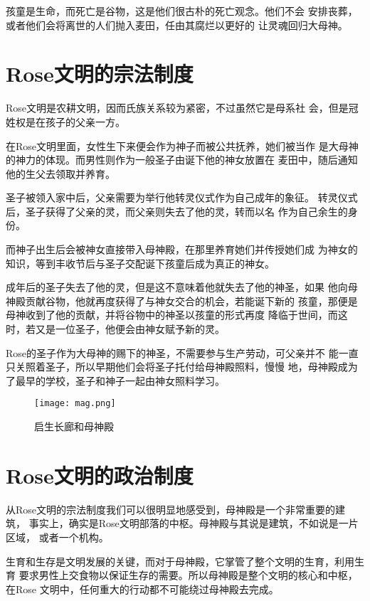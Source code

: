 \documentclass[UTF8,12pt]{ctexbook}
\begin{document}
            孩童是生命，而死亡是谷物，这是他们很古朴的死亡观念。他们不会
            安排丧葬，或者他们会将离世的人们抛入麦田，任由其腐烂以更好的
            让灵魂回归大母神。

        \section{Rose文明的宗法制度}
            Rose文明是农耕文明，因而氏族关系较为紧密，不过虽然它是母系社
            会，但是冠姓权是在孩子的父亲一方。

            在Rose文明里面，女性生下来便会作为神子而被公共抚养，她们被当作
            是大母神的神力的体现。而男性则作为一般圣子由诞下他的神女放置在
            麦田中，随后通知他的生父去领取并养育。

            圣子被领入家中后，父亲需要为举行他转灵仪式作为自己成年的象征。
            转灵仪式后，圣子获得了父亲的灵，而父亲则失去了他的灵，转而以名
            作为自己余生的身份。

            而神子出生后会被神女直接带入母神殿，在那里养育她们并传授她们成
            为神女的知识，等到丰收节后与圣子交配诞下孩童后成为真正的神女。

            成年后的圣子失去了他的灵，但是这不意味着他就失去了他的神圣，如果
            他向母神殿贡献谷物，他就再度获得了与神女交合的机会，若能诞下新的
            孩童，那便是母神收到了他的贡献，并将谷物中的神圣以孩童的形式再度
            降临于世间，而这时，若又是一位圣子，他便会由神女赋予新的灵。

            Rose的圣子作为大母神的赐下的神圣，不需要参与生产劳动，可父亲并不
            能一直只关照着圣子，所以早期他们会将圣子托付给母神殿照料，慢慢
            地，母神殿成为了最早的学校，圣子和神子一起由神女照料学习。
            \newpage
                \begin{figure}[!h]
                    \centering
                    \texttt{[image: mag.png]}
                    \caption{启生长廊和母神殿}
                \end{figure}
        \section{Rose文明的政治制度}
            从Rose文明的宗法制度我们可以很明显地感受到，母神殿是一个非常重要的建筑，
            事实上，确实是Rose文明部落的中枢。母神殿与其说是建筑，不如说是一片区域，
            或者一个机构。

            生育和生存是文明发展的关键，而对于母神殿，它掌管了整个文明的生育，利用生育
            要求男性上交食物以保证生存的需要。所以母神殿是整个文明的核心和中枢，在Rose
            文明中，任何重大的行动都不可能绕过母神殿去完成。
\end{document}
